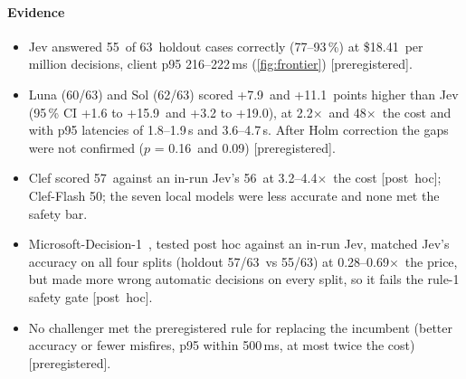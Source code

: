 \documentclass[11pt,letterpaper]{article}
\newcommand{\prereg}{\mbox{\textsf{\small\color{okblue}[preregistered]}}}
\newcommand{\posthoc}{\mbox{\textsf{\small\color{okgray}[post hoc]}}}
\newcommand{\X}{\ensuremath{\times}}
\newcommand{\ClClefCostXHigh}{4.4}
\newcommand{\ClClefCostXLow}{3.2}
\newcommand{\ClHoldClefAcc}{57}
\newcommand{\ClHoldFlashAcc}{50}
\newcommand{\ClHoldJevAcc}{56}
\newcommand{\MsHoldoutJevK}{55}
\newcommand{\MsHoldoutJevN}{63}
\newcommand{\MsHoldoutMsK}{57}
\newcommand{\MsHoldoutMsN}{63}
\newcommand{\MsPriceXHi}{0.69}
\newcommand{\MsPriceXLo}{0.28}
\newcommand{\HoldN}{63}
\newcommand{\JevHoldAccCI}{77--93\,\%}
\newcommand{\JevHoldAccK}{55}
\newcommand{\JevHoldCost}{18.41}
\newcommand{\JevHoldPninetyfiveRange}{216--222}
\newcommand{\LunaHoldAccK}{60}
\newcommand{\LunaHoldCostX}{2.2}
\newcommand{\LunaHoldPninetyfiveRangeS}{1.8--1.9}
\newcommand{\LunaHoldRAccDiff}{+7.9}
\newcommand{\LunaHoldRAccDiffCI}{+1.6 to +15.9}
\newcommand{\LunaHoldRAccPHolm}{0.16}
\newcommand{\SolHoldAccK}{62}
\newcommand{\SolHoldCostX}{48}
\newcommand{\SolHoldPninetyfiveRangeS}{3.6--4.7}
\newcommand{\SolHoldRAccDiff}{+11.1}
\newcommand{\SolHoldRAccDiffCI}{+3.2 to +19.0}
\newcommand{\SolHoldRAccPHolm}{0.09}
\begin{document}
\paragraph{Evidence}
\begin{itemize}[leftmargin=1.2em]
  \item Jev answered \JevHoldAccK\ of \HoldN\ holdout cases correctly (\JevHoldAccCI) at \$\JevHoldCost\ per million
    decisions, client p95 \JevHoldPninetyfiveRange\,ms (\cref{fig:frontier}) \prereg.
  \item Luna (\LunaHoldAccK/\HoldN) and Sol (\SolHoldAccK/\HoldN) scored \LunaHoldRAccDiff\ and \SolHoldRAccDiff\ points higher than Jev
    (95\,\% CI \LunaHoldRAccDiffCI\ and \SolHoldRAccDiffCI), at \LunaHoldCostX\X\ and \SolHoldCostX\X\ the cost and with
    p95 latencies of \LunaHoldPninetyfiveRangeS\,s and \SolHoldPninetyfiveRangeS\,s. After Holm correction the gaps were
    not confirmed ($p$ = \LunaHoldRAccPHolm\ and \SolHoldRAccPHolm) \prereg.
  \item Clef scored \ClHoldClefAcc\ against an in-run Jev's \ClHoldJevAcc\ at \ClClefCostXLow--\ClClefCostXHigh\X\ the cost
    \posthoc; Clef-Flash \ClHoldFlashAcc; the seven local models were less accurate and none met the safety bar.
  \item Microsoft-Decision-1~\cite{msd1router}, tested post hoc against an in-run Jev, matched Jev's accuracy on all four
    splits (holdout \MsHoldoutMsK/\MsHoldoutMsN\ vs \MsHoldoutJevK/\MsHoldoutJevN) at \MsPriceXLo--\MsPriceXHi\X\ the price,
    but made more wrong automatic decisions on every split, so it fails the rule-1 safety gate \posthoc.
  \item No challenger met the preregistered rule for replacing the incumbent (better accuracy or fewer misfires, p95
    within 500\,ms, at most twice the cost) \prereg.
\end{itemize}
\end{document}
